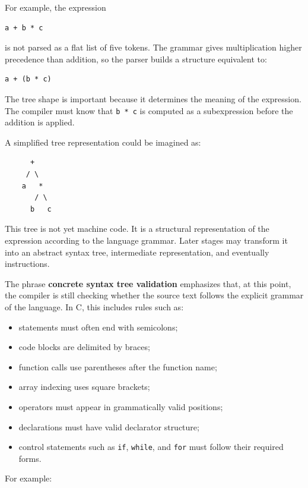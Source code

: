 For example, the expression

\begin{verbatim}
a + b * c
\end{verbatim}

is not parsed as a flat list of five tokens. The grammar gives multiplication higher precedence than addition, so the parser builds a structure equivalent to:

\begin{verbatim}
a + (b * c)
\end{verbatim}

The tree shape is important because it determines the meaning of the expression. The compiler must know that \texttt{b * c} is computed as a subexpression before the addition is applied.

A simplified tree representation could be imagined as:

\begin{verbatim}
      +
     / \
    a   *
       / \
      b   c
\end{verbatim}

This tree is not yet machine code. It is a structural representation of the expression according to the language grammar. Later stages may transform it into an abstract syntax tree, intermediate representation, and eventually instructions.

The phrase \textbf{concrete syntax tree validation} emphasizes that, at this point, the compiler is still checking whether the source text follows the explicit grammar of the language. In C, this includes rules such as:

\begin{itemize}
    \item statements must often end with semicolons;
    \item code blocks are delimited by braces;
    \item function calls use parentheses after the function name;
    \item array indexing uses square brackets;
    \item operators must appear in grammatically valid positions;
    \item declarations must have valid declarator structure;
    \item control statements such as \texttt{if}, \texttt{while}, and \texttt{for} must follow their required forms.
\end{itemize}

For example:

